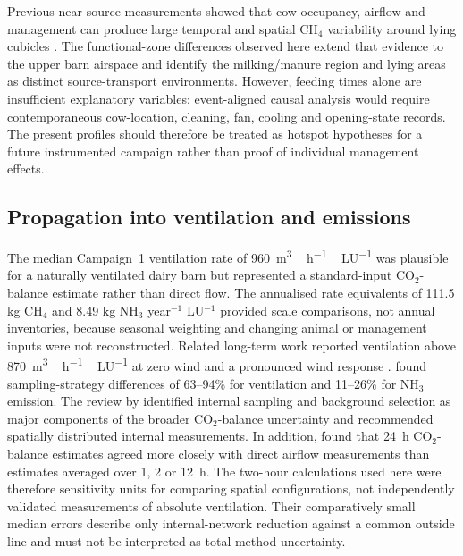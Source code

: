 \documentclass[12pt,a4paper]{article}
\begin{document}
Previous near-source measurements showed that cow occupancy, airflow and management can produce large temporal and spatial \(\mathrm{CH_4}\) variability around lying cubicles \citep{Wu2016}. The functional-zone differences observed here extend that evidence to the upper barn airspace and identify the milking/manure region and lying areas as distinct source-transport environments. However, feeding times alone are insufficient explanatory variables: event-aligned causal analysis would require contemporaneous cow-location, cleaning, fan, cooling and opening-state records. The present profiles should therefore be treated as hotspot hypotheses for a future instrumented campaign rather than proof of individual management effects.

\subsection{Propagation into ventilation and emissions}

The median Campaign~1 ventilation rate of \SI{960}{m^3\,h^{-1}\,LU^{-1}} was plausible for a naturally ventilated dairy barn but represented a standard-input \(\mathrm{CO_2}\)-balance estimate rather than direct flow. The annualised rate equivalents of 111.5 kg \(\mathrm{CH_4}\) and 8.49 kg \(\mathrm{NH_3}\) year\(^{-1}\) LU\(^{-1}\) provided scale comparisons, not annual inventories, because seasonal weighting and changing animal or management inputs were not reconstructed. Related long-term work reported ventilation above \SI{870}{m^3\,h^{-1}\,LU^{-1}} at zero wind and a pronounced wind response \citep{Schmithausen2018}. \citet{JankeSampling2020} found sampling-strategy differences of 63--94\% for ventilation and 11--26\% for \(\mathrm{NH_3}\) emission. The review by \citet{Apostolico2026} identified internal sampling and background selection as major components of the broader \(\mathrm{CO_2}\)-balance uncertainty and recommended spatially distributed internal measurements. In addition, \citet{Wang2016} found that \SI{24}{h} \(\mathrm{CO_2}\)-balance estimates agreed more closely with direct airflow measurements than estimates averaged over 1, 2 or \SI{12}{h}. The two-hour calculations used here were therefore sensitivity units for comparing spatial configurations, not independently validated measurements of absolute ventilation. Their comparatively small median errors describe only internal-network reduction against a common outside line and must not be interpreted as total method uncertainty.
\end{document}
